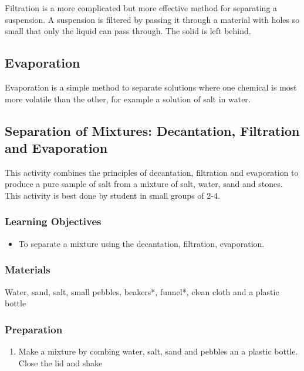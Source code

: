 Filtration is a more complicated but more effective method for separating a suspension. A suspension is filtered by passing it through a material with holes so small that only the liquid can pass through. The solid is left behind.

\subsection{Evaporation}

Evaporation is a simple method to separate solutions where one chemical is most more volatile than the other, for example a solution of salt in water.

\subsection{Separation of Mixtures: Decantation, Filtration and Evaporation}
This activity combines the principles of decantation, filtration and evaporation to produce a pure sample of salt from a mixture of salt, water, sand and stones. This activity is best done by student in small groups of 2-4.

\subsubsection*{Learning Objectives}
\begin{itemize}
\item{To separate  a mixture using the decantation, filtration, evaporation.}
\end{itemize}

\subsubsection*{Materials}
Water, sand, salt, small pebbles, beakers*, funnel*, clean cloth and a plastic bottle
\subsubsection*{Preparation}
\begin{enumerate}
\item{Make a mixture by combing water, salt, sand and pebbles an a plastic bottle. Close the lid and shake}
\end{enumerate}
